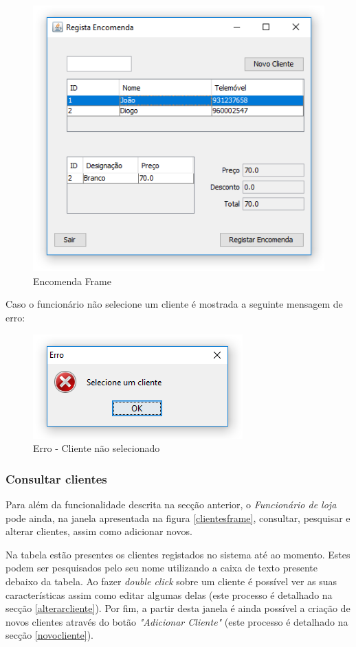 \documentclass[11pt]{article} %
\begin{document}
\begin{figure}[H]
	\centering
	\includegraphics[]{regencomendaframe.png}
	\caption{Encomenda Frame}
	\label{regencomendaframe}
\end{figure}

Caso o funcionário não selecione um cliente é mostrada a seguinte mensagem de erro:

\begin{figure}[H]
	\centering
	\includegraphics[]{erroencomenda.png}
	\caption{Erro - Cliente não selecionado}
	\label{erroencomenda}
\end{figure}


\subsubsection{Consultar clientes}
Para além da funcionalidade descrita na secção anterior, o \textit{Funcionário de loja} pode ainda, na janela apresentada na figura \ref{clientesframe}, consultar, pesquisar e alterar clientes, assim como adicionar novos. 

Na tabela estão presentes os clientes registados no sistema até ao momento. Estes podem ser pesquisados pelo seu nome utilizando a caixa de texto presente debaixo da tabela. Ao fazer \textit{double click} sobre um cliente é possível ver as suas características assim como editar algumas delas (este processo é detalhado na secção \ref{alterarcliente}). Por fim, a partir desta janela é ainda possível a criação de novos clientes através do botão \textit{"Adicionar Cliente"} (este processo é detalhado na secção \ref{novocliente}).
\end{document}
